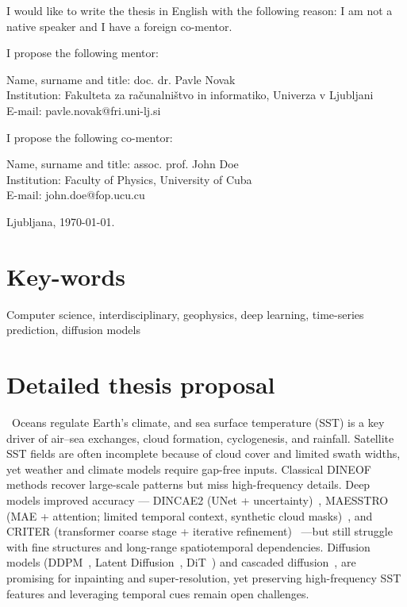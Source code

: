 \documentclass[a4paper, 12pt]{article}
\begin{document}
I would like to write the thesis in English with the following reason: I am not a native speaker and I have a foreign co-mentor.

I propose the following mentor:

\hfill\begin{minipage}{\dimexpr\textwidth-2cm}
Name, surname and title: doc. dr. Pavle Novak\\
Institution: Fakulteta za računalništvo in informatiko, Univerza v Ljubljani\\
E-mail: pavle.novak@fri.uni-lj.si
\end{minipage}

I propose the following co-mentor:

\hfill\begin{minipage}{\dimexpr\textwidth-2cm}
Name, surname and title: assoc. prof. John Doe \\
Institution: Faculty of Physics, University of Cuba\\
E-mail: john.doe@fop.ucu.cu
\end{minipage}

\bigskip

\hfill Ljubljana, \today. \newpage


\section*{Key-words}

Computer science, interdisciplinary, geophysics, deep learning, time-series prediction, diffusion models
 
\section*{Detailed thesis proposal}
 
\ProblemParagraph~Oceans regulate Earth’s climate, and sea surface temperature (SST) is a key driver of air–sea exchanges, cloud formation, cyclogenesis, and rainfall. Satellite SST fields are often incomplete because of cloud cover and limited swath widths, yet weather and climate models require gap-free inputs. Classical DINEOF~\cite{AlveraAzcarate2007Multivariate} methods recover large-scale patterns but miss high-frequency details. Deep models improved accuracy — DINCAE2 (UNet + uncertainty)~\cite{Barth2022DINCAE2}, MAESSTRO (MAE + attention; limited temporal context, synthetic cloud masks)~\cite{Goh2024MAESSTRO}, and CRITER (transformer coarse stage + iterative refinement)~\cite{Muc2025} —but still struggle with fine structures and long-range spatiotemporal dependencies. Diffusion models (DDPM~\cite{Ho2020DDPM}, Latent Diffusion~\cite{Rombach2022LDM}, DiT~\cite{Peebles2023DiT}) and cascaded diffusion~\cite{Ho2022CDM}, are promising for inpainting and super-resolution, yet preserving high-frequency SST features and leveraging temporal cues remain open challenges.
 
\end{document}
